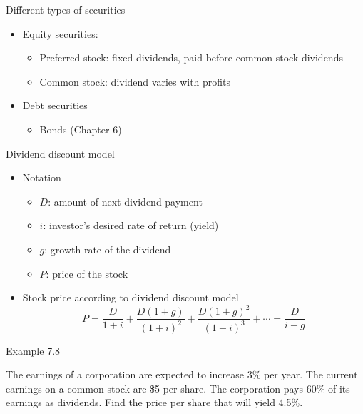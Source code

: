 \documentclass{beamer}
\begin{document}
\begin{frame}{Different types of securities}

\begin{itemize}
\item Equity securities:
  \begin{itemize}
  \item Preferred stock: fixed dividends, paid before common stock dividends
  \item Common stock: dividend varies with profits
  \end{itemize}
\item Debt securities
  \begin{itemize}
  \item Bonds (Chapter 6)
  \end{itemize}
\end{itemize}

\end{frame}

\begin{frame}{Dividend discount model}

\begin{itemize}
\item Notation
  \begin{itemize}
  \item $D$: amount of next dividend payment
  \item $i$: investor's desired rate of return (yield)
  \item $g$: growth rate of the dividend
  \item $P$: price of the stock
  \end{itemize}
\item Stock price according to dividend discount model
\[
P = \frac{D}{1+i} + \frac{D(1+g)}{(1+i)^2} + \frac{D(1+g)^2}{(1+i)^3} + \cdots = \frac{D}{i-g}
\]
\end{itemize}

\end{frame}

\begin{frame}{Example 7.8}

The earnings of a corporation are expected to increase 3\% per year. The current earnings on a common stock are \$5 per share. The corporation pays 60\% of its earnings as dividends. Find the price per share that will yield 4.5\%.

\vfill
\end{frame}
\end{document}
